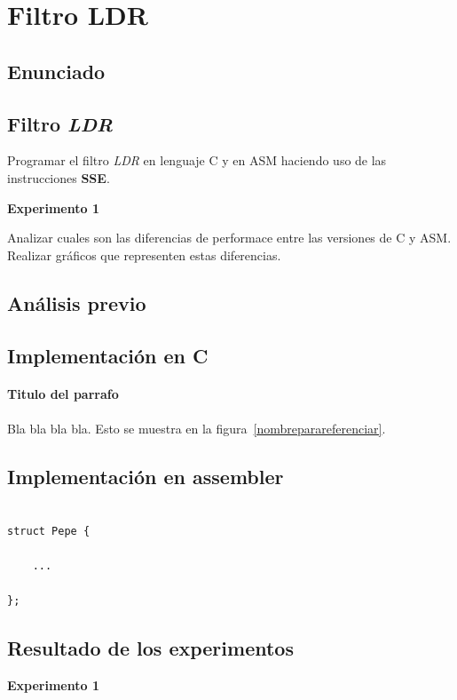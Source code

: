 \section{Filtro LDR}
\subsection{Enunciado}

\subsection*{Filtro \textit{LDR}}
  Programar el filtro \textit{LDR} en lenguaje C y en
  ASM haciendo uso de las instrucciones \textbf{SSE}.

\vspace*{0.3cm} \noindent
\textbf{Experimento 1}

  Analizar cuales son las diferencias de performace entre las versiones de C y ASM. 
  Realizar gráficos que representen estas diferencias.
  
\subsection{An\'alisis previo}

\subsection{Implementaci\'on en C}
\paragraph{\textbf{Titulo del parrafo} } Bla bla bla bla.
Esto se muestra en la figura~\ref{nombreparareferenciar}.
\subsection{Implementaci\'on en assembler}
\begin{codesnippet}
\begin{verbatim}

struct Pepe {

    ...

};
\end{verbatim}
\end{codesnippet}
\subsection{Resultado de los experimentos}

\vspace*{0.3cm} \noindent
\textbf{Experimento 1}

